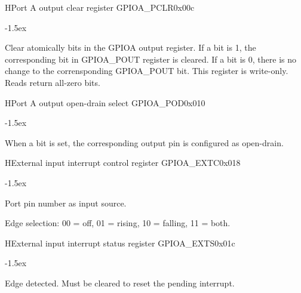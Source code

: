 \documentclass[12pt]{article}
\begin{document}
\begin{register}{H}{Port A output clear register GPIOA\_PCLR}{0x00c}%
\label{pclr}%
\regnewline%
\end{register}
\begin{regdesc}[0.7\textwidth]\begin{reglist}[000000]
\itemsep-1.5ex
\item[PCLR] Clear atomically bits in the GPIOA output register. If a bit is 1, the corresponding bit in GPIOA\_POUT register is cleared. If a bit is 0, there is no change to the corrensponding GPIOA\_POUT bit. This register is write-only. Reads return all-zero bits.
\end{reglist}\end{regdesc}

\begin{register}{H}{Port A output open-drain select GPIOA\_POD}{0x010}%
\label{pod}%
\regnewline%
\end{register}
\begin{regdesc}[0.7\textwidth]\begin{reglist}[000000]
\itemsep-1.5ex
\item[POD] When a bit is set, the corresponding output pin is configured as open-drain.
\end{reglist}\end{regdesc}

\begin{register}{H}{External input interrupt control register GPIOA\_EXTC}{0x018}%
\label{extc}%
%
%
%
\regnewline%
\end{register}
\begin{regdesc}[0.7\textwidth]\begin{reglist}[000000]
\itemsep-1.5ex
\item[PINNR] Port pin number as input source.
\item[EDGE] Edge selection: 00 = off, 01 = rising, 10 = falling, 11 = both. 
\end{reglist}\end{regdesc}

\begin{register}{H}{External input interrupt status register GPIOA\_EXTS}{0x01c}%
\label{exts}%
%
\regnewline%
\end{register}
\begin{regdesc}[0.7\textwidth]\begin{reglist}[000000]
\itemsep-1.5ex
\item[DETECT] Edge detected. Must be cleared to reset the pending interrupt.
\end{reglist}\end{regdesc}
\end{document}
